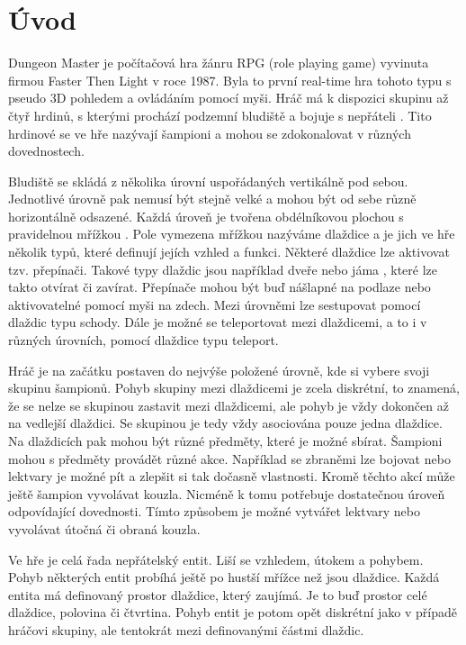 \chapter{Úvod}

Dungeon Master je počítačová hra žánru RPG (role playing game) vyvinuta firmou Faster Then Light v roce 1987.
Byla to první real-time hra tohoto typu s pseudo 3D pohledem a ovládáním pomocí myši. Hráč má k dispozici skupinu až čtyř hrdinů,
s kterými prochází podzemní bludiště a bojuje s nepřáteli . Tito hrdinové se ve hře nazývají šampioni a mohou se 
zdokonalovat v různých dovednostech. 


Bludiště se skládá z několika úrovní uspořádaných vertikálně pod sebou. 
Jednotlivé úrovně pak nemusí být stejně velké a mohou být od sebe různě horizontálně odsazené.
Každá úroveň je tvořena obdélníkovou plochou s pravidelnou mřížkou . Pole vymezena mřížkou nazýváme dlaždice a je jich 
ve hře několik typů, které definují jejích vzhled a funkci. Některé dlaždice lze aktivovat tzv. přepínači. Takové typy dlaždic
jsou například dveře nebo jáma , které lze takto otvírat či zavírat. Přepínače mohou být buď nášlapné na podlaze nebo aktivovatelné
pomocí myši na zdech. Mezi úrovněmi lze sestupovat pomocí dlaždic typu schody.  Dále je možné se teleportovat mezi dlaždicemi, a to i v různých úrovních, pomocí dlaždice
typu teleport. 


Hráč je na začátku postaven do nejvýše položené úrovně, kde si vybere svoji skupinu šampionů. 
Pohyb skupiny mezi dlaždicemi je zcela diskrétní, to znamená, že se nelze se skupinou zastavit mezi dlaždicemi, ale pohyb je vždy dokončen
až na vedlejší dlaždici. Se skupinou je tedy vždy asociována pouze jedna dlaždice. Na dlaždicích pak mohou
být různé předměty, které je možné sbírat. Šampioni mohou s předměty provádět různé akce.
Například se zbraněmi lze bojovat nebo lektvary je možné pít a zlepšit si tak dočasně vlastnosti. Kromě těchto 
akcí může ještě šampion vyvolávat kouzla. Nicméně k tomu potřebuje dostatečnou úroveň odpovídající dovednosti.
Tímto způsobem je možné vytvářet lektvary nebo vyvolávat útočná či obraná kouzla.

Ve hře je celá řada nepřátelský entit. Liší se vzhledem, útokem a pohybem. Pohyb některých entit 
probíhá ještě po hustší mřížce než jsou dlaždice. Každá entita má definovaný prostor dlaždice, který zaujímá. Je to buď prostor
celé dlaždice, polovina či čtvrtina.  Pohyb entit je potom opět diskrétní jako v případě hráčovi skupiny, 
ale tentokrát mezi definovanými částmi dlaždic. 

